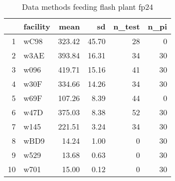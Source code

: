 \begin{table}[H]
\centering
\begin{tabular}{rlrrrr}
  \hline
 & facility & mean & sd & n\_test & n\_pi \\ 
  \hline
1 & wC98 & 323.42 & 45.70 &  28 &   0 \\ 
  2 & w3AE & 393.84 & 16.31 &  34 &  30 \\ 
  3 & w096 & 419.71 & 15.16 &  41 &  30 \\ 
  4 & w30F & 334.66 & 14.26 &  34 &  30 \\ 
  5 & w69F & 107.26 & 8.39 &  44 &   0 \\ 
  6 & w47D & 375.03 & 8.38 &  52 &  30 \\ 
  7 & w145 & 221.51 & 3.24 &  34 &  30 \\ 
  8 & wBD9 & 14.24 & 1.00 &   0 &  30 \\ 
  9 & w529 & 13.68 & 0.63 &   0 &  30 \\ 
  10 & w701 & 15.00 & 0.12 &   0 &  30 \\ 
   \hline
\end{tabular}
\caption{Data methods feeding flash plant fp24} 
\label{tab:well_summaries_fp14}
\end{table}
